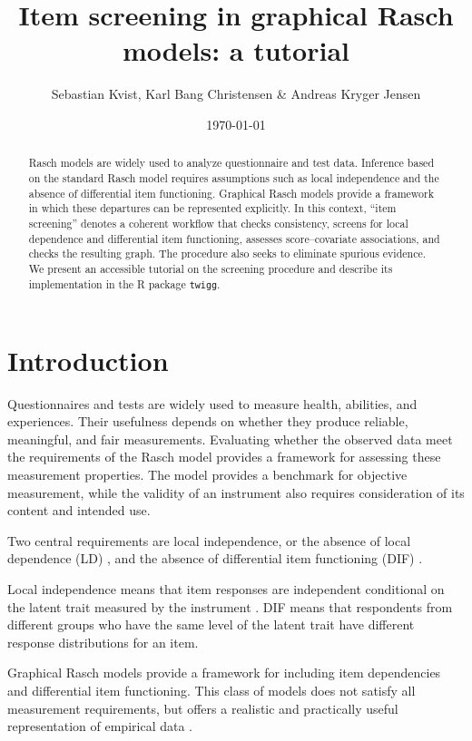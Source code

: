 \documentclass[12pt]{article}
\title{Item screening in graphical Rasch models: a tutorial}
\author{Sebastian Kvist, Karl Bang Christensen \& Andreas Kryger Jensen}
\affil{Section of Biostatistics, Department of Public Health, University of Copenhagen}
\date{\today}
\theoremstyle{examplestyle}
\begin{document}
\maketitle

\begin{abstract}
Rasch models are widely used to analyze questionnaire and test data. Inference based on the standard Rasch model requires assumptions such as local independence and the absence of differential item functioning. Graphical Rasch models provide a framework in which these departures can be represented explicitly. In this context, ``item screening'' denotes a coherent workflow that checks consistency, screens for local dependence and differential item functioning, assesses score--covariate associations, and checks the resulting graph. The procedure also seeks to eliminate spurious evidence. We present an accessible tutorial on the screening procedure and describe its implementation in the R package \texttt{twigg}.
\end{abstract}

\section{Introduction}

Questionnaires and tests are widely used to measure health, abilities, and experiences. Their usefulness depends on whether they produce reliable, meaningful, and fair measurements. Evaluating whether the observed data meet the requirements of the Rasch \citeyearpar{rasch-1960} model provides a framework for assessing these measurement properties. The model provides a benchmark for objective measurement, while the validity of an instrument also requires consideration of its content and intended use.

Two central requirements are local independence, or the absence of local dependence (LD) \citep{lazarsfeld-henry-1968}, and the absence of differential item functioning (DIF) \citep{holland-wainer-2012}.

Local independence means that item responses are independent conditional on the latent trait measured by the instrument \citep{lord-novick-1968}. DIF means that respondents from different groups who have the same level of the latent trait have different response distributions for an item.

Graphical Rasch models \citep{kreiner-christensen-2002,kreiner-christensen-2004,kreiner-christensen-2007} provide a framework for including item dependencies and differential item functioning. This class of models does not satisfy all measurement requirements, but offers a realistic and practically useful representation of empirical data \citep{kreiner-2007}.
\end{document}
